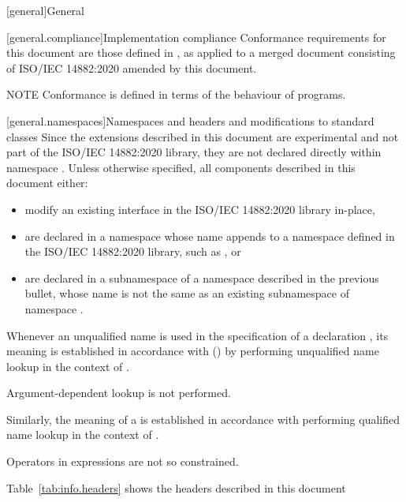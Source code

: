 [general]{General}

[general.compliance]{Implementation compliance}
Conformance requirements for this document are those defined in , as applied to a merged document consisting of ISO/IEC 14882:2020 amended by this document.

NOTE Conformance is defined in terms of the behaviour of programs.%

[general.namespaces]{Namespaces and headers and modifications to standard classes}
Since the extensions described in this document are experimental and not part of the ISO/IEC 14882:2020 library, they are not declared directly within namespace . Unless otherwise specified, all components described in this document either:

\begin{itemize}
    \item modify an existing interface in the ISO/IEC 14882:2020 library in-place,
    \item are declared in a namespace whose name appends  to a namespace defined in the ISO/IEC 14882:2020 library, such as , or
    \item are declared in a subnamespace of a namespace described in the previous bullet, whose name is not the same as an existing subnamespace of namespace .
\end{itemize}

Whenever an unqualified name is used
in the specification of a declaration ,
its meaning is established
in accordance with () by performing unqualified name lookup
in the context of .
\begin{note}
Argument-dependent lookup is not performed.\end{note}
Similarly, the meaning of a  is established
in accordance with performing qualified name lookup
in the context of .
\begin{note}
Operators in expressions are not so constrained.\end{note}

Table~\ref{tab:info.headers} shows the headers described in this document

